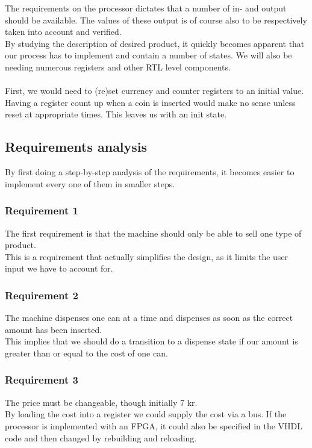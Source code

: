 The requirements on the processor dictates that a number of in- and output should be available. The values of these output is of course also to be respectively taken into account and verified.\\
By studying the description of desired product, it quickly becomes apparent that our process has to implement and contain a number of states. We will also be needing numerous registers and other RTL level components.\\\\
First, we would need to (re)set currency and counter registers to an initial value. Having a register count up when a coin is inserted would make no sense unless reset at appropriate times. This leaves us with an init state.


\subsection{Requirements analysis}
\label{sec:requirement_analysis}
By first doing a step-by-step analysis of the requirements, it becomes easier to implement every one of them in smaller steps.
\subsubsection*{Requirement 1}
The first requirement is that the machine should only be able to sell one type of product.\\
This is a requirement that actually simplifies the design, as it limits the user input we have to account for.

\subsubsection*{Requirement 2}
The machine dispenses one can at a time and dispenses as soon as the correct amount has been inserted.\\
This implies that we should do a transition to a dispense state if our amount is greater than or equal to the cost of one can.

\subsubsection*{Requirement 3}
The price must be changeable, though initially 7 kr.\\
By loading the cost into a register we could supply the cost via a bus. If the processor is implemented with an FPGA, it could also be specified in the VHDL code and then changed by rebuilding and reloading.

